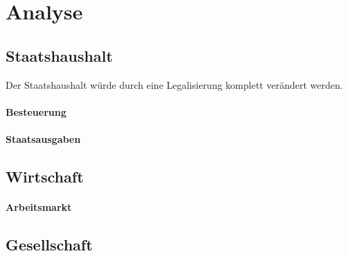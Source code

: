 \documentclass[../main.tex]{subfiles}
\begin{document}
	\section{Analyse}
	
	\subsection{Staatshaushalt}
	
	Der Staatshaushalt würde durch eine Legalisierung komplett verändert werden.
	
	
	\paragraph{Besteuerung}
	
	\paragraph{Staatsausgaben}
	
	
	
	
	
	\subsection{Wirtschaft}
	
	\paragraph{Arbeitsmarkt}
	
	
	
	
	
	\subsection{Gesellschaft}
	
	
	
	
\end{document}
